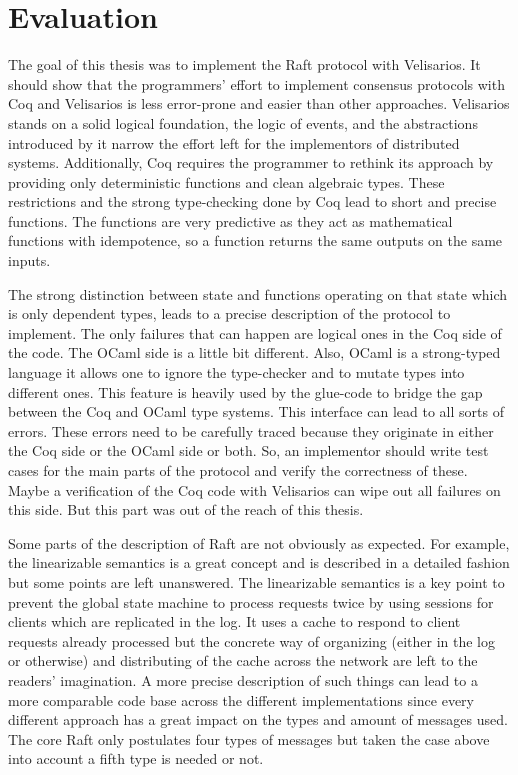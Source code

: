 %
\section{Evaluation}
\label{sec_5}

The goal of this thesis was to implement the Raft protocol
with Velisarios. It should show that the programmers'
effort to implement consensus protocols with Coq and
Velisarios is less error-prone and easier than other
approaches. Velisarios stands on a solid
logical foundation, the logic of events, and the
abstractions introduced by it narrow the effort
left for the implementors of distributed systems.
Additionally, Coq requires the programmer to rethink
its approach by providing only deterministic functions
and clean algebraic types. These restrictions and
the strong type-checking done by Coq lead to short and
precise functions. The functions are very predictive as they
act as mathematical functions with idempotence, so
a function returns the same outputs on the same inputs.

The strong distinction between state and functions operating
on that state which is only dependent types, leads to a
precise description of the protocol to implement.
The only failures that can happen are logical ones
in the Coq side of the code. The OCaml side is a little
bit different. Also, OCaml is a strong-typed language
it allows one to ignore the type-checker and to mutate
types into different ones. This feature is heavily
used by the glue-code to bridge the gap between
the Coq and OCaml type systems. This interface
can lead to all sorts of errors. These errors need
to be carefully traced because they originate in either
the Coq side or the OCaml side or both. So, an implementor
should write test cases for the main parts of the protocol
and verify the correctness of these. Maybe a verification
of the Coq code with Velisarios 
can wipe out all failures on this side. But this part
was out of the reach of this thesis. 

Some parts of the description of Raft are not
obviously as expected. For example, the linearizable
semantics is a great concept and is described in a
detailed fashion but some points are left unanswered.
The linearizable semantics is a key point to
prevent the global state machine to process requests
twice by using sessions for clients which are replicated
in the log. It uses a cache to respond to client requests
already processed but the concrete way of organizing
(either in the log or otherwise) and distributing of
the cache across the network are left to the readers'
imagination. A more precise description of such things
can lead to a more comparable code base across the
different implementations since every different approach
has a great impact on the types and amount of messages
used. The core Raft only postulates four types of
messages but taken the case above into account a fifth
type is needed or not.

